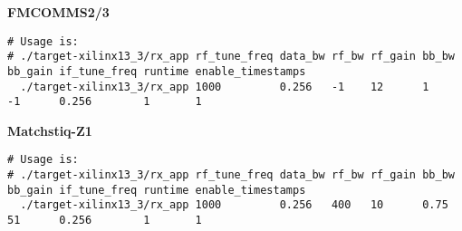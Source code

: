 \small
\noindent\textbf{FMCOMMS2/3}
\scriptsize
\begin{verbatim}
# Usage is:
# ./target-xilinx13_3/rx_app rf_tune_freq data_bw rf_bw rf_gain bb_bw bb_gain if_tune_freq runtime enable_timestamps
  ./target-xilinx13_3/rx_app 1000         0.256   -1    12      1     -1      0.256        1       1
\end{verbatim}
\par\medskip
\small

\noindent\textbf{Matchstiq-Z1}
\scriptsize
\begin{verbatim}
# Usage is:
# ./target-xilinx13_3/rx_app rf_tune_freq data_bw rf_bw rf_gain bb_bw bb_gain if_tune_freq runtime enable_timestamps
  ./target-xilinx13_3/rx_app 1000         0.256   400   10      0.75  51      0.256        1       1
\end{verbatim}
\par\medskip
\small

